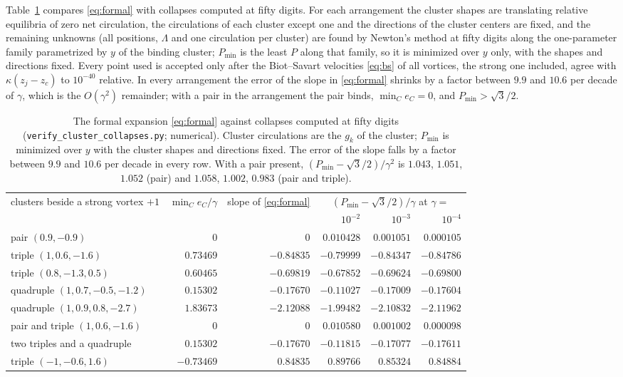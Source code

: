 \documentclass[11pt]{article}
\theoremstyle{definition}
\begin{document}
Table~\ref{tab:clusters} compares \eqref{eq:formal} with collapses computed at fifty digits. For each arrangement the cluster shapes are translating relative equilibria of zero net circulation, the circulations of each cluster except one and the directions of the cluster centers are fixed, and the remaining unknowns (all positions, $\Lambda$ and one circulation per cluster) are found by Newton's method at fifty digits along the one-parameter family parametrized by $y$ of the binding cluster; $P_{\min}$ is the least $P$ along that family, so it is minimized over $y$ only, with the shapes and directions fixed. Every point used is accepted only after the Biot--Savart velocities \eqref{eq:bs} of all vortices, the strong one included, agree with $\kappa(z_j - z_c)$ to $10^{-40}$ relative. In every arrangement the error of the slope in \eqref{eq:formal} shrinks by a factor between $9.9$ and $10.6$ per decade of $\gamma$, which is the $O(\gamma^2)$ remainder; with a pair in the arrangement the pair binds, $\min_C e_C = 0$, and $P_{\min} > \sqrt{3}/2$.

\begin{table}[t]
\centering
\small
\renewcommand{\arraystretch}{1.15}
\begin{tabular}{@{}lrrrrr@{}}
\toprule
clusters beside a strong vortex $+1$ & $\min_C e_C/\gamma$ & slope of \eqref{eq:formal} & \multicolumn{3}{c}{$(P_{\min} - \sqrt{3}/2)/\gamma$ at $\gamma =$} \\
 & & & $10^{-2}$ & $10^{-3}$ & $10^{-4}$ \\
\midrule
pair $(0.9, -0.9)$ & $0$ & $0$ & $0.010428$ & $0.001051$ & $0.000105$ \\
triple $(1, 0.6, -1.6)$ & $0.73469$ & $-0.84835$ & $-0.79999$ & $-0.84347$ & $-0.84786$ \\
triple $(0.8, -1.3, 0.5)$ & $0.60465$ & $-0.69819$ & $-0.67852$ & $-0.69624$ & $-0.69800$ \\
quadruple $(1, 0.7, -0.5, -1.2)$ & $0.15302$ & $-0.17670$ & $-0.11027$ & $-0.17009$ & $-0.17604$ \\
quadruple $(1, 0.9, 0.8, -2.7)$ & $1.83673$ & $-2.12088$ & $-1.99482$ & $-2.10832$ & $-2.11962$ \\
pair and triple $(1, 0.6, -1.6)$ & $0$ & $0$ & $0.010580$ & $0.001002$ & $0.000098$ \\
two triples and a quadruple & $0.15302$ & $-0.17670$ & $-0.11815$ & $-0.17077$ & $-0.17611$ \\
triple $(-1, -0.6, 1.6)$ & $-0.73469$ & $0.84835$ & $0.89766$ & $0.85324$ & $0.84884$ \\
\bottomrule
\end{tabular}
\caption{The formal expansion \eqref{eq:formal} against collapses computed at fifty digits (\texttt{verify\_\allowbreak cluster\_\allowbreak collapses.py}; numerical). Cluster circulations are the $g_k$ of the cluster; $P_{\min}$ is minimized over $y$ with the cluster shapes and directions fixed. The error of the slope falls by a factor between $9.9$ and $10.6$ per decade in every row. With a pair present, $(P_{\min} - \sqrt{3}/2)/\gamma^2$ is $1.043$, $1.051$, $1.052$ (pair) and $1.058$, $1.002$, $0.983$ (pair and triple).}\label{tab:clusters}
\end{table}
\end{document}
